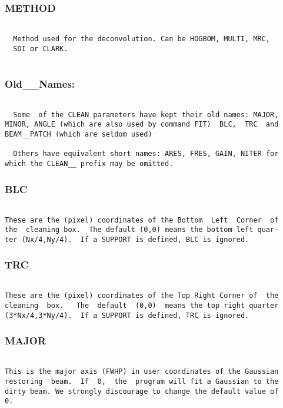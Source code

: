\subsubsection{METHOD}
\begin{verbatim}

  Method used for the deconvolution. Can be HOGBOM, MULTI, MRC,
  SDI or CLARK.


\end{verbatim}
\subsubsection{Old\_\_Names:}
\begin{verbatim}

  Some  of the CLEAN parameters have kept their old names: MAJOR,
MINOR, ANGLE (which are also used by command FIT)  BLC,  TRC  and
BEAM__PATCH (which are seldom used)

  Others have equivalent short names: ARES, FRES, GAIN, NITER for
which the CLEAN__ prefix may be omitted.

\end{verbatim}
\subsubsection{BLC}
\begin{verbatim}

These are the (pixel) coordinates of the Bottom  Left  Corner  of
the  cleaning box.  The default (0,0) means the bottom left quar-
ter (Nx/4,Ny/4).  If a SUPPORT is defined, BLC is ignored.

\end{verbatim}
\subsubsection{TRC}
\begin{verbatim}

These are the (pixel) coordinates of the Top Right Corner of  the
cleaning  box.   The  default  (0,0)  means the top right quarter
(3*Nx/4,3*Ny/4).  If a SUPPORT is defined, TRC is ignored.

\end{verbatim}
\subsubsection{MAJOR}
\begin{verbatim}

This is the major axis (FWHP) in user coordinates of the Gaussian
restoring  beam.  If  0,  the  program will fit a Gaussian to the
dirty beam. We strongly discourage to change the default value of
0.

\end{verbatim}

